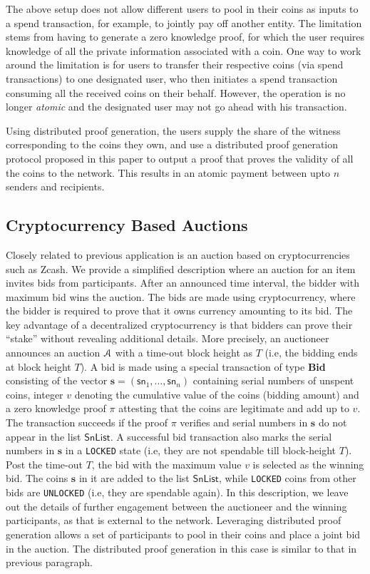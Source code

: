  The above setup does not allow different users to pool in their coins as inputs to a spend transaction, for example,
to jointly pay off another entity. The limitation stems from having to generate a zero knowledge proof, for which the user requires knowledge of all the
private information associated with a coin. One way to work around the limitation is for users to transfer their respective coins (via spend transactions) 
to one designated user, who then initiates a spend transaction consuming all the received coins on their behalf. 
However, the operation is no longer {\em atomic} and the designated user may not go ahead with his transaction. 

 Using distributed proof generation, the users supply the share of the witness corresponding to the coins they own,
and use a distributed proof generation protocol proposed in this paper to output a proof that proves the validity of all the coins to the network. This
results in an atomic payment between upto $n$ senders and recipients.

\subsection{Cryptocurrency Based Auctions}
Closely related to previous application is an auction based on cryptocurrencies such as Zcash. We provide a simplified description where
an auction for an item invites bids from participants. After an announced time interval, the bidder with maximum bid wins the auction. The bids are
made using cryptocurrency, where the bidder is required to prove that it owns currency amounting to its bid. The key advantage of a decentralized
cryptocurrency is that bidders can prove their ``stake'' without revealing additional details. More precisely, an auctioneer announces an auction
$\mathcal{A}$ with a time-out block height as $T$ (i.e, the bidding ends at block height $T$). A bid is made using a special transaction of type {\bf Bid}
consisting of the vector $\bm{s}=(\mathsf{sn}_1,\ldots,\mathsf{sn}_n)$ containing serial numbers of unspent coins, integer $v$ denoting the cumulative
value of the coins (bidding amount) and a zero knowledge proof $\pi$ attesting that the coins are legitimate and add up to $v$. The transaction succeeds
if the proof $\pi$ verifies and serial numbers in $\bm{s}$ do not appear in the list $\mathsf{SnList}$. A successful bid transaction also marks
the serial numbers in $\bm{s}$ in a {\tt LOCKED} state (i.e, they are not spendable till block-height $T$). Post the time-out $T$, 
the bid with the maximum value $v$ is selected as the winning bid. The 
coins $\bm{s}$ in it are added to the list $\mathsf{SnList}$, while {\tt LOCKED} coins from other bids are {\tt UNLOCKED} (i.e, they are spendable again).
In this description, we leave out the details of further engagement between the auctioneer and the winning participants, as that is external to the network.
Leveraging distributed proof generation allows a set of participants to pool in their coins and place a joint bid in the auction. The distributed proof
generation in this case is similar to that in previous paragraph.



